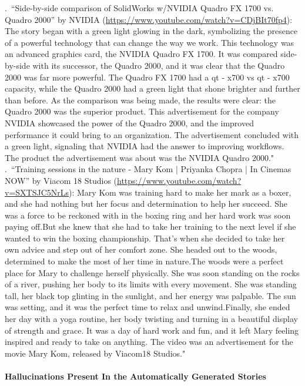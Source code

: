     .~``Side-by-side comparison of SolidWorks w/NVIDIA Quadro FX 1700 vs. Quadro 2000'' by NVIDIA (\url{https://www.youtube.com/watch?v=CDjBIt70fp4}): The story began with a green light glowing in the dark, symbolizing the presence of a powerful technology that can change the way we work. This technology was an advanced graphics card, the NVIDIA Quadro FX 1700. It was compared side-by-side with its successor, the Quadro 2000, and it was clear that the Quadro 2000 was far more powerful. The Quadro FX 1700 had a qt - x700 vs qt - x700 capacity, while the Quadro 2000 had a green light that shone brighter and further than before. As the comparison was being made, the results were clear: the Quadro 2000 was the superior product. This advertisement for the company NVIDIA showcased the power of the Quadro 2000, and the improved performance it could bring to an organization. The advertisement concluded with a green light, signaling that NVIDIA had the answer to improving workflows. The product the advertisement was about was the NVIDIA Quadro 2000." \\

    

    .~``Training sessions in the nature - Mary Kom | Priyanka Chopra | In Cinemas NOW'' by Viacom 18 Studios (\url{https://www.youtube.com/watch?v=SXTSJC5NrLs}): Mary Kom was training hard to make her mark as a boxer, and she had nothing but her focus and determination to help her succeed. She was a force to be reckoned with in the boxing ring and her hard work was soon paying off.But she knew that she had to take her training to the next level if she wanted to win the boxing championship. That's when she decided to take her own advice and step out of her comfort zone. She headed out to the woods, determined to make the most of her time in nature.The woods were a perfect place for Mary to challenge herself physically. She was soon standing on the rocks of a river, pushing her body to its limits with every movement. She was standing tall, her black top glinting in the sunlight, and her energy was palpable. The sun was setting, and it was the perfect time to relax and unwind.Finally, she ended her day with a yoga routine, her body twisting and turning in a beautiful display of strength and grace. It was a day of hard work and fun, and it left Mary feeling inspired and ready to take on anything. The video was an advertisement for the movie Mary Kom, released by Viacom18 Studios." \\


\paragraph{Hallucinations Present In the Automatically Generated Stories}

